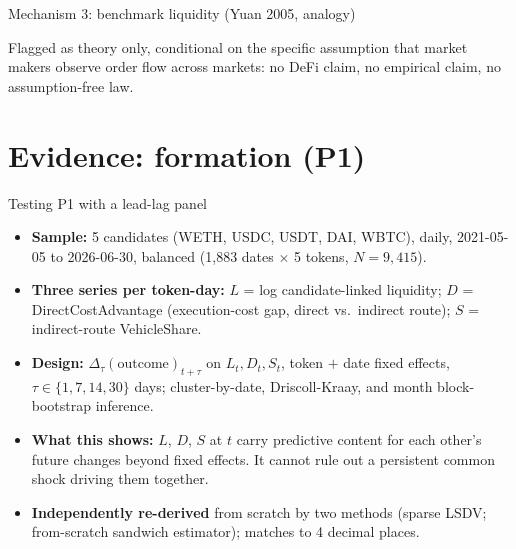 \documentclass[aspectratio=169]{beamer}
\begin{document}
\begin{frame}{Mechanism 3: benchmark liquidity (Yuan 2005, analogy)}
  \begin{center}
  \end{center}
  {\footnotesize Flagged as theory only, conditional on the specific assumption that market makers observe order flow across markets: no DeFi claim, no empirical claim, no assumption-free law.}
\end{frame}

\section{Evidence: formation (P1)}

\begin{frame}{Testing P1 with a lead-lag panel}
  \begin{itemize}
    \item \textbf{Sample:} 5 candidates (WETH, USDC, USDT, DAI, WBTC), daily, 2021-05-05 to 2026-06-30, balanced (1{,}883 dates $\times$ 5 tokens, $N=9{,}415$).
    \item \textbf{Three series per token-day:} $L$ = log candidate-linked liquidity; $D$ = DirectCostAdvantage (execution-cost gap, direct vs.\ indirect route); $S$ = indirect-route VehicleShare.
    \item \textbf{Design:} $\Delta_\tau(\text{outcome})_{t+\tau}$ on $L_t, D_t, S_t$, token $+$ date fixed effects, $\tau \in \{1,7,14,30\}$ days; cluster-by-date, Driscoll-Kraay, and month block-bootstrap inference.
    \item \textbf{What this shows:} $L$, $D$, $S$ at $t$ carry predictive content for each other's future changes beyond fixed effects. It cannot rule out a persistent common shock driving them together.
    \item \textbf{Independently re-derived} from scratch by two methods (sparse LSDV; from-scratch sandwich estimator); matches to 4 decimal places.
  \end{itemize}
\end{frame}
\end{document}
